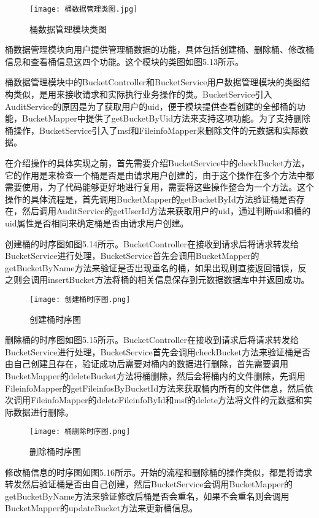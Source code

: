 \begin{figure}
  \centering
  \texttt{[image: 桶数据管理类图.jpg]}
  \caption{桶数据管理模块类图}
\end{figure}

桶数据管理模块向用户提供管理桶数据的功能，具体包括创建桶、删除桶、修改桶信息和查看桶信息这四个功能。这个模块的类图如图5.13所示。

桶数据管理模块中的BucketController和BucketService用户数据管理模块的类图结构类似，是用来接收请求和实际执行业务操作的类。BucketService引入AuditService的原因是为了获取用户的uid，便于模块提供查看创建的全部桶的功能，BucketMapper中提供了getBucketByUid方法来支持这项功能。为了支持删除桶操作，BucketService引入了msf和FileinfoMapper来删除文件的元数据和实际数据。

在介绍操作的具体实现之前，首先需要介绍BucketService中的checkBucket方法，它的作用是来检查一个桶是否是由请求用户创建的，由于这个操作在多个方法中都需要使用，为了代码能够更好地进行复用，需要将这些操作整合为一个方法。这个操作的具体流程是，首先调用BucketMapper的getBucketById方法验证桶是否存在，然后调用AuditService的getUserId方法来获取用户的uid，通过判断uid和桶的uid属性是否相同来确定桶是否由请求用户创建。

创建桶的时序图如图5.14所示。BucketController在接收到请求后将请求转发给BucketService进行处理，BucketService首先会调用BucketMapper的getBucketByName方法来验证是否出现重名的桶，如果出现则直接返回错误，反之则会调用insertBucket方法将桶的相关信息保存到元数据数据库中并返回成功。

\begin{figure}
  \centering
  \texttt{[image: 创建桶时序图.png]}
  \caption{创建桶时序图}
\end{figure}

删除桶的时序图如图5.15所示。BucketController在接收到请求后将请求转发给BucketService进行处理，BucketService首先会调用checkBucket方法来验证桶是否由自己创建且存在，验证成功后需要对桶内的数据进行删除，首先需要调用BucketMapper的deleteBucket方法将桶删除，然后会将桶内的文件删除，先调用FileinfoMapper的getFileinfosByBucketId方法来获取桶内所有的文件信息，然后依次调用FileinfoMapper的deleteFileinfoById和msf的delete方法将文件的元数据和实际数据进行删除。

\begin{figure}
  \centering
  \texttt{[image: 桶删除时序图.png]}
  \caption{删除桶时序图}
\end{figure}

修改桶信息的时序图如图5.16所示。开始的流程和删除桶的操作类似，都是将请求转发然后验证桶是否由自己创建，然后BucketService会调用BucketMapper的getBucketByName方法来验证修改后桶是否会重名，如果不会重名则会调用BucketMapper的updateBucket方法来更新桶信息。

